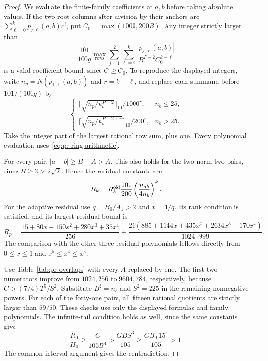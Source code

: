 \documentclass[12pt]{article}
\numberwithin{equation}{section}
\begin{document}
\begin{proof}
We evaluate the finite-family coefficients at $a,b$ before taking
absolute values. If the two root columns after division by their
anchors are $\sum_{\ell=0}^k p_{j,\ell}(a,b)c^\ell$, put
$C_0=\max(1000,200B)$. Any integer strictly larger than
\begin{equation}\label{eq:pr-fixed-M}
 \frac{101}{100g}\max_{\mathrm{rows}}
 \sum_{j=1}^2\sum_{\ell=0}^k
 \frac{|p_{j,\ell}(a,b)|}{B^{P-2}C_0^{k-\ell}}
\end{equation}
is a valid coefficient bound, since $C\ge C_0$.
To reproduce the displayed integers, write
$n_p=N(p_{j,\ell}(a,b))$ and $r=k-\ell$, and replace each summand
before $101/(100g)$ by
\[
 \begin{cases}
 \lceil\sqrt{n_p/n_b^{P-2}}\rceil_{10}/1000^r,&n_b\le25,\\
 \lceil\sqrt{n_p/n_b^{P-2+r}}\rceil_{10}/200^r,&n_b>25.
 \end{cases}
\]
Take the integer part of the largest rational row sum, plus one.
Every polynomial evaluation uses~\eqref{eq:pr-ring-arithmetic}.

For every pair, $|a-b|\ge B-A>A$. This also holds for the two
norm-two pairs, since $B\ge3>2\sqrt2$. Hence the residual constants are
\begin{equation}\label{eq:pr-fixed-R}
 R_k=R_k^{\rm old}\frac{101}{200}
                 \left(\frac{n_{ab}}{4n_b}\right)^k.
\end{equation}
For the adaptive residual use $q=B_0/A_1>2$ and $x=1/q$.
Its rank condition is satisfied, and its largest residual bound is
\begin{equation}\label{eq:pr-fixed-Rp}
 R_p=\frac{15+80x+150x^2+280x^3+35x^4}{256}
 +\frac{21(885+1144x+435x^2+2634x^3+170x^4)}{1024\cdot999}.
\end{equation}
The comparison with the other three residual polynomials follows
directly from $0\le x\le1$ and $x^5\le x^4\le x^3$.

Use Table~\ref{tab:pr-overlaps} with every $A$ replaced by one.
The first two numerators improve from $1024,256$ to $9604,784$,
respectively, because $C>(7/4)T^5/S^2$.
Substitute $B^2=n_b$ and $S^2=225$ in the remaining nonnegative
powers. For each of the forty-one pairs, all fifteen rational
quotients are strictly larger than $59/50$.
These checks use only the displayed formulas and family polynomials.
The infinite-tail condition holds as well, since the same constants give
\[
 \frac{R_0}{H_0}\ge\frac{C}{105B^4}
 >\frac{GBS^3}{105}\ge\frac{GB_0\,15^3}{105}>1.
\]
The common interval argument gives the contradiction.
\end{proof}
\end{document}
